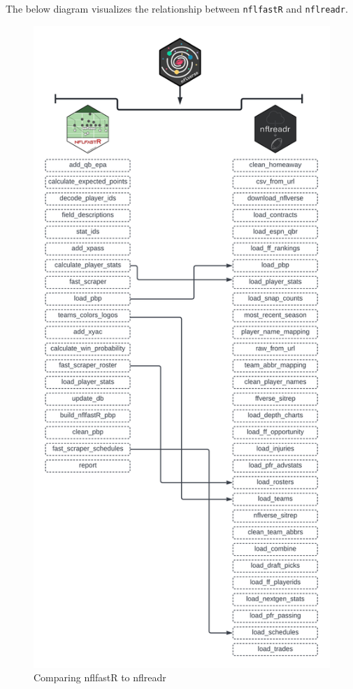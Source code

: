 \documentclass[
  letterpaper,
]{krantz}
\begin{document}
The below diagram visualizes the relationship between \texttt{nflfastR}
and \texttt{nflreadr}.

\begin{figure}

{\centering \includegraphics[width=1\textwidth,height=\textheight]{./images/updated-diagram.png}

}

\caption{Comparing nflfastR to nflreadr}

\end{figure}
\end{document}
